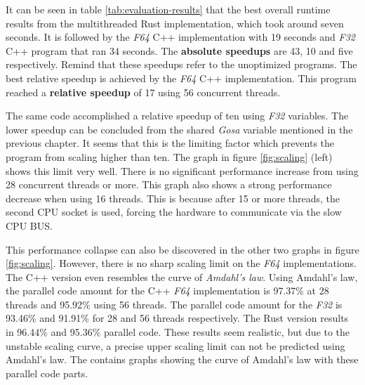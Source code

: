 It can be seen in table \ref{tab:evaluation-results} that the best overall runtime results from the multithreaded Rust implementation, which took around seven seconds. It is followed by the \textit{F64} C++ implementation with 19 seconds and \textit{F32} C++ program that ran 34 seconds. The \textbf{absolute speedups} are 43, 10 and five respectively. Remind that these speedups refer to the unoptimized programs. The best relative speedup is achieved by the \textit{F64} C++ implementation. This program reached a \textbf{relative speedup} of 17 using 56 concurrent threads.

The same code accomplished a relative speedup of ten using \textit{F32} variables. The lower speedup can be concluded from the shared \textit{Gosa} variable mentioned in the previous chapter. It seems that this is the limiting factor which prevents the program from scaling higher than ten. The graph in figure \ref{fig:scaling} (left) shows this limit very well. There is no significant performance increase from using 28 concurrent threads or more. This graph also shows a strong performance decrease when using 16 threads. This is because after 15 or more threads, the second CPU socket is used, forcing the hardware to communicate via the slow CPU BUS.

This performance collapse can also be discovered in the other two graphs in figure \ref{fig:scaling}. However, there is no sharp scaling limit on the \textit{F64} implementations. The C++ version even resembles the curve of \textit{Amdahl's law}. Using Amdahl's law, the parallel code amount for the C++ \textit{F64} implementation is 97.37\% at 28 threads and 95.92\% using 56 threads. The parallel code amount for the \textit{F32} is 93.46\% and 91.91\% for 28 and 56 threads respectively. The Rust version results in 96.44\% and 95.36\% parallel code. These results seem realistic, but due to the unstable scaling curve, a precise upper scaling limit can not be predicted using Amdahl's law. The  contains graphs showing the curve of Amdahl's law with these parallel code parts.

